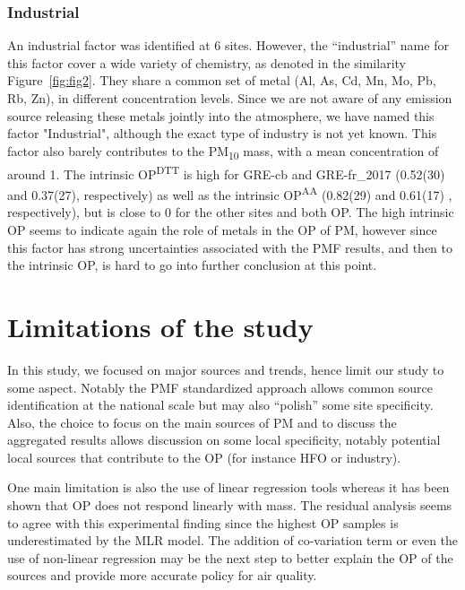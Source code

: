 \documentclass[
]{article}
\begin{document}
\hypertarget{industrial}{%
\subsubsection{Industrial}\label{industrial}}

An industrial factor was identified at 6 sites. However, the
``industrial'' name for this factor cover a wide variety of chemistry,
as denoted in the similarity
Figure~\protect\hyperlink{fig:fig2}{{[}fig:fig2{]}}. They share a common
set of metal (Al, As, Cd, Mn, Mo, Pb, Rb, Zn), in different
concentration levels. Since we are not aware of any emission source
releasing these metals jointly into the atmosphere, we have named this
factor "Industrial", although the exact type of industry is not yet
known. This factor also barely contributes to the PM\textsubscript{10}
mass, with a mean concentration of around 1. The intrinsic
OP\textsuperscript{DTT} is high for GRE-cb and GRE-fr\_2017 (0.52(30)
and 0.37(27), respectively) as well as the intrinsic
OP\textsuperscript{AA} (0.82(29) and 0.61(17) , respectively), but is
close to 0 for the other sites and both OP. The high intrinsic OP seems
to indicate again the role of metals in the OP of PM, however since this
factor has strong uncertainties associated with the PMF results, and
then to the intrinsic OP, is hard to go into further conclusion at this
point.

\hypertarget{limitations-of-the-study}{%
\section{Limitations of the study}\label{limitations-of-the-study}}

In this study, we focused on major sources and trends, hence limit our
study to some aspect. Notably the PMF standardized approach allows
common source identification at the national scale but may also
``polish'' some site specificity. Also, the choice to focus on the main
sources of PM and to discuss the aggregated results allows discussion on
some local specificity, notably potential local sources that contribute
to the OP (for instance HFO or industry).

One main limitation is also the use of linear regression tools whereas
it has been shown that OP does not respond linearly with mass. The
residual analysis seems to agree with this experimental finding since
the highest OP samples is underestimated by the MLR model. The addition
of co-variation term or even the use of non-linear regression may be the
next step to better explain the OP of the sources and provide more
accurate policy for air quality.
\end{document}
